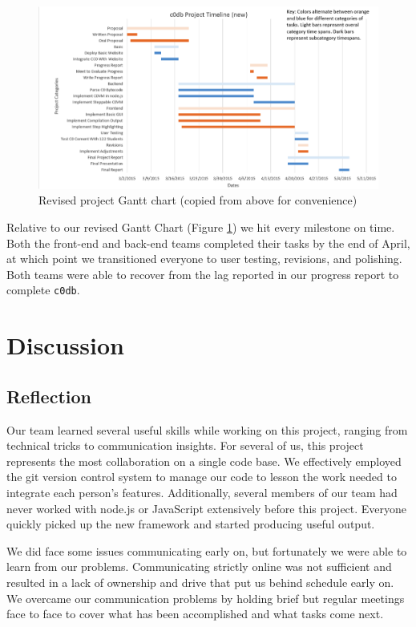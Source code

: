 \documentclass[11pt]{article}
\begin{document}
\begin{figure}[h]
  \includegraphics[width=\linewidth]{new-gantt}
  \caption{Revised project Gantt chart (copied from above for convenience)}
  \label{gantt}
\end{figure}
Relative to our revised Gantt Chart (Figure \ref{gantt}) we hit every milestone
on time. Both the front-end and back-end teams completed their tasks by the end
of April, at which point we transitioned everyone to user testing, revisions,
and polishing. Both teams were able to recover from the lag reported in our
progress report to complete {\tt c0db}.

\section{Discussion}
\subsection{Reflection}
Our team learned several useful skills while working on this project, ranging
from technical tricks to communication insights. For several of us, this project
represents the most collaboration on a single code base. We effectively employed
the git version control system to manage our code to lesson the work needed to
integrate each person's features. Additionally, several members of our team had
never worked with node.js or JavaScript extensively before this project.
Everyone quickly picked up the new framework and started producing useful
output.
\par
We did face some issues communicating early on, but fortunately we were able to
learn from our problems. Communicating strictly online was not sufficient and
resulted in a lack of ownership and drive that put us behind schedule early on.
We overcame our communication problems by holding brief but regular meetings
face to face to cover what has been accomplished and what tasks come next.
\end{document}
